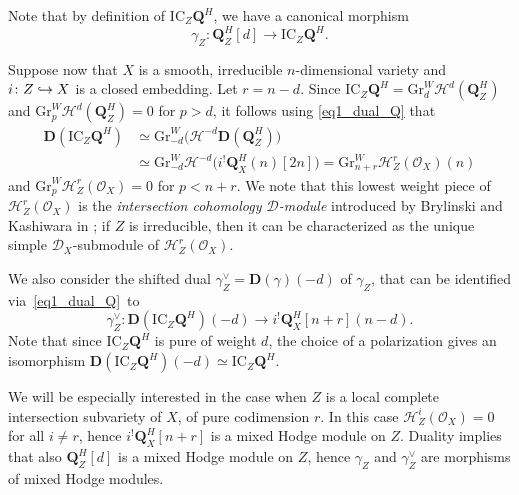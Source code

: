 \documentclass[JEP,XML,SOM,Unicode]{cedram}
\newcommand\hto{\mathrel{\lhook\joinrel\to}}
\theoremstyle{plain}
\theoremstyle{definition}
\newcommand\Q{{\mathbf Q}}
\newcommand\cD{\mathcal{D}}
\newcommand\cH{\mathcal{H}}
\newcommand\cO{\mathcal{O}}
\newcommand\cH{\mathcal{H}}
\newcommand\cO{\mathcal{O}}
\newcommand\gr{\mathrm{Gr}}
\begin{document}
Note that by definition of $\mathrm{IC}_Z\Q^H$, we have a canonical morphism
\begin{equation}\label{def_gamma}
\gamma_Z\colon\Q_Z^H[d]\to \mathrm{IC}_Z\Q^H.
\end{equation}

Suppose now that $X$ is a smooth, irreducible $n$-dimensional variety and $i\colon Z\hto X$ is a closed embedding. Let $r\!=\!n-d$.
Since $\mathrm{IC}_Z\Q^H\!=\!\gr^W_d\cH^d(\Q_Z^H)$ and $\gr^W_p\cH^d(\Q_Z^H)\!=\!0$ for $p>d$, it follows using \eqref{eq1_dual_Q} that
\begin{equation}\label{eq_dual_IC}
\begin{aligned}
{\mathbf D}(\mathrm{IC}_Z\Q^H)&\simeq\gr^W_{-d}\big(\cH^{-d}{\mathbf D}(\Q_Z^H)\big)\\
&\simeq\gr^W_{-d}\cH^{-d}\big(i^!\Q_X^H(n)[2n]\big)=\gr^W_{n+r}\cH^r_Z(\cO_X)(n)
\end{aligned}
\end{equation}
and $\gr^W_p\cH^r_Z(\cO_X)=0$ for $p<n+r$. We note that this lowest
weight piece of $\cH^r_Z(\cO_X)$ is the \emph{intersection cohomology $\cD$-module} introduced by Brylinski and Kashiwara in \cite{BK};
if $Z$ is irreducible, then it can be characterized as the unique simple $\cD_X$\nobreakdash-sub\-module of $\cH^r_Z(\cO_X)$.

We also consider the shifted dual $\gamma_Z^{\vee}={\mathbf D}(\gamma)(-d)$ of $\gamma_Z$, that can be identified via~\eqref{eq1_dual_Q}~to
\begin{equation}\label{def_gamma_2}
\gamma_Z^{\vee}\colon {\mathbf D}(\mathrm{IC}_Z\Q^H)(-d)\to i^!\Q_X^H[n+r](n-d).
\end{equation}
Note that since $\mathrm{IC}_Z\Q^H$ is pure of weight $d$, the choice of a polarization gives an isomorphism
${\mathbf D}(\mathrm{IC}_Z\Q^H)(-d)\simeq \mathrm{IC}_Z\Q^H$.

We will be especially interested in the case when $Z$ is a local complete intersection subvariety of $X$, of pure codimension $r$.
In this case $\cH^i_Z(\cO_X)=0$ for all $i\neq r$, hence $i^!\Q_X^H[n+r]$ is a mixed Hodge module on $Z$. Duality implies that
also $\Q_Z^H[d]$ is a mixed Hodge module on $Z$, hence $\gamma_Z$ and $\gamma_Z^{\vee}$ are morphisms of mixed Hodge
modules.
\end{document}
